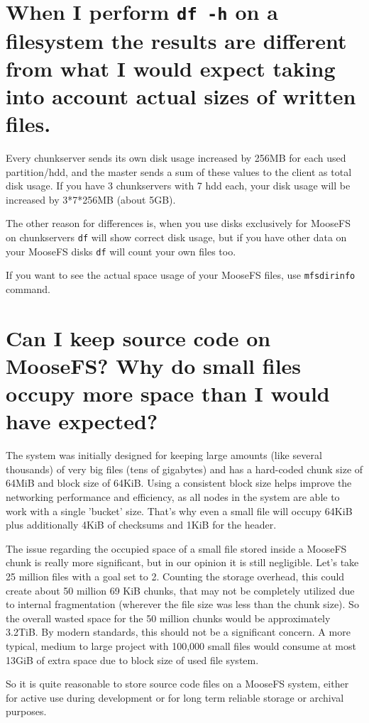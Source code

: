 \documentclass[a4paper,11pt,english]{report}
\def\code#1{\texttt{#1}}
\begin{document}
		
		\section{When I perform \code{df -h} on a filesystem the results are different from what I would expect taking into account actual sizes of written files.}
		Every chunkserver sends its own disk usage increased by 256MB for each used partition/hdd, and the master sends a sum of these values to the client as total disk usage. If you have 3 chunkservers with 7 hdd each, your disk usage will be increased by 3*7*256MB (about 5GB).
		
		The other reason for differences is, when you use disks exclusively for MooseFS on chunkservers \code{df} will show correct disk usage, but if you have other data on your MooseFS disks \code{df} will count your own files too.  
		
		If you want to see the actual space usage of your MooseFS files, use \code{mfsdirinfo} command.
		
		
		\section{Can I keep source code on MooseFS? Why do small files occupy more space than I would have expected?}
		The system was initially designed for keeping large amounts (like several thousands) of very big files (tens of gigabytes) and has a hard-coded chunk size of 64MiB and block size of 64KiB. Using a consistent block size helps improve the networking performance and efficiency, as all nodes in the system are able to work with a single 'bucket' size. That's why even a small file will occupy 64KiB plus additionally 4KiB of checksums and 1KiB for the header.
		
		The issue regarding the occupied space of a small file stored inside a MooseFS chunk is really more significant, but in our opinion it is still negligible. Let's take 25 million files with a goal set to 2. Counting the storage overhead, this could create about 50 million 69 KiB chunks, that may not be completely utilized due to internal fragmentation (wherever the file size was less than the chunk size). So the overall wasted space for the 50 million chunks would be approximately 3.2TiB. By modern standards, this should not be a significant concern. A more typical, medium to large project with 100,000 small files would consume at most 13GiB of extra space due to block size of used file system.
		
		So it is quite reasonable to store source code files on a MooseFS system, either for active use during development or for long term reliable storage or archival purposes.
		
\end{document}

